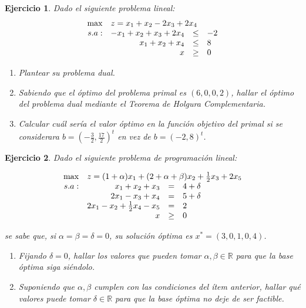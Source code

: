 \documentclass[a4paper,oneside,12pt]{amsart}
\newtheorem{quest}{Ejercicio}
\begin{document}

\begin{quest}
Dado el siguiente problema lineal:
    \[
    \begin{array}{rrcl}
    \max & \multicolumn{3}{l}{z = x_1+x_2-2x_3+2x_4} \\
    s.a: & -x_1+x_2+x_3+2x_4 & \leq & -2 \\
     & x_1+x_2+x_4 & \leq & 8 \\
     & x & \geq & 0 \\
    \end{array}
    \]
    \begin{enumerate}[label=\alph*)]
        \item Plantear su problema dual.
        \item Sabiendo que el óptimo del problema primal es $(6, 0, 0, 2)$, hallar el óptimo del problema dual mediante el Teorema de Holgura Complementaria.
        \item Calcular cuál sería el valor óptimo en la función objetivo del primal si se considerara $b=(-\frac{3}{2}, \frac{17}{2})^t$ en vez de $b=(-2, 8)^t$.
    \end{enumerate}

\end{quest}



\begin{quest}
Dado el siguiente problema de programación lineal:

\[
\begin{array}{rrcl}
\max & \multicolumn{3}{l}{z = (1+\alpha)x_1+(2+\alpha+\beta)x_2+\frac{1}{2}x_3+2x_5} \\
s.a: & x_1+x_2+x_3 & = & 4 + \delta \\
 & 2x_1-x_3+x_4 & = & 5 + \delta\\
 & 2x_1-x_2+\frac{1}{2}x_4-x_5 & = & 2 \\
 & x & \geq & 0
\end{array}
\]

se sabe que, si $\alpha=\beta=\delta=0$, su solución óptima es $x^\ast = (3, 0, 1, 0, 4)$.
\begin{enumerate}[label=\alph*)]
    \item Fijando $\delta = 0$, hallar los valores que pueden tomar $\alpha,\beta\in \mathbb{R}$ para que la base óptima siga siéndolo.
    \item Suponiendo que $\alpha, \beta$ cumplen con las condiciones del ítem anterior, hallar qué valores puede tomar $\delta\in\mathbb{R}$ para que la base óptima no deje de ser factible.
\end{enumerate}
\end{quest}
\end{document}
